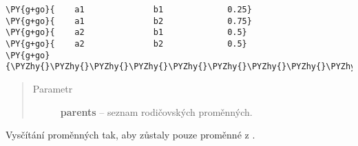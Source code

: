 \begin{fulllineitems}
\begin{fulllineitems}
\begin{Verbatim}[commandchars=\\\{\}]
\PY{g+go}{    a1              b1             0.25}
\PY{g+go}{    a1              b2             0.75}
\PY{g+go}{    a2              b1             0.5}
\PY{g+go}{    a2              b2             0.5}
\PY{g+go}{\PYZhy{}\PYZhy{}\PYZhy{}\PYZhy{}\PYZhy{}\PYZhy{}\PYZhy{}\PYZhy{}\PYZhy{}\PYZhy{}\PYZhy{}\PYZhy{}\PYZhy{}\PYZhy{}\PYZhy{}\PYZhy{}\PYZhy{}\PYZhy{}\PYZhy{}\PYZhy{}\PYZhy{}\PYZhy{}\PYZhy{}\PYZhy{}\PYZhy{}\PYZhy{}\PYZhy{}\PYZhy{}\PYZhy{}\PYZhy{}\PYZhy{}\PYZhy{}\PYZhy{}\PYZhy{}\PYZhy{}\PYZhy{}\PYZhy{}\PYZhy{}\PYZhy{}\PYZhy{}\PYZhy{}\PYZhy{}\PYZhy{}\PYZhy{}\PYZhy{}\PYZhy{}\PYZhy{}\PYZhy{}\PYZhy{}\PYZhy{}}
\end{Verbatim}
\begin{quote}\begin{description}
\item[{Parametr}] \leavevmode
\textbf{parents} -- seznam rodičovských proměnných.

\end{description}\end{quote}

\end{fulllineitems}


\begin{fulllineitems}
\label{alex.infer:alex.infer.factor.Factor.marginalize}
Vysčítání proměnných tak, aby zůstaly pouze proměnné z .


\end{fulllineitems}
\end{fulllineitems}
